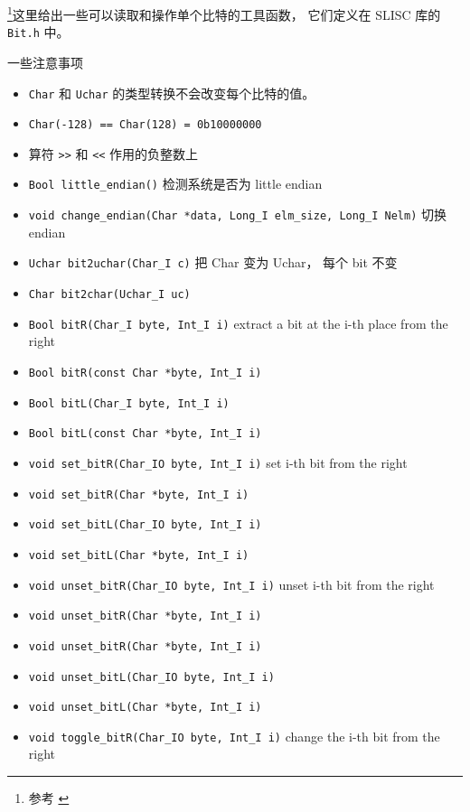 
\footnote{参考 \cite{NR3}}这里给出一些可以读取和操作单个比特的工具函数， 它们定义在 SLISC 库的 \verb`Bit.h` 中。

一些注意事项
\begin{itemize}
\item \verb`Char` 和 \verb`Uchar` 的类型转换不会改变每个比特的值。
\item \verb`Char(-128) == Char(128) = 0b10000000`
\item 算符 \verb`>>` 和 \verb`<<` 作用的负整数上
\end{itemize}

\begin{itemize}
\item \verb`Bool little_endian()` 检测系统是否为 little endian
\item \verb`void change_endian(Char *data, Long_I elm_size, Long_I Nelm)` 切换 endian
\item \verb`Uchar bit2uchar(Char_I c)` 把 Char 变为 Uchar， 每个 bit 不变
\item \verb`Char bit2char(Uchar_I uc)`
\item \verb`Bool bitR(Char_I byte, Int_I i)` extract a bit at the i-th place from the right
\item \verb`Bool bitR(const Char *byte, Int_I i)`
\item \verb`Bool bitL(Char_I byte, Int_I i)`
\item \verb`Bool bitL(const Char *byte, Int_I i)`
\item \verb`void set_bitR(Char_IO byte, Int_I i)` set i-th bit from the right
\item \verb`void set_bitR(Char *byte, Int_I i)`
\item \verb`void set_bitL(Char_IO byte, Int_I i)`
\item \verb`void set_bitL(Char *byte, Int_I i)`
\item \verb`void unset_bitR(Char_IO byte, Int_I i)` unset i-th bit from the right
\item \verb`void unset_bitR(Char *byte, Int_I i)`
\item \verb`void unset_bitR(Char *byte, Int_I i)`
\item \verb`void unset_bitL(Char_IO byte, Int_I i)`
\item \verb`void unset_bitL(Char *byte, Int_I i)`
\item \verb`void toggle_bitR(Char_IO byte, Int_I i)` change the i-th bit from the right

\end{itemize}
